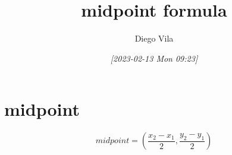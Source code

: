 \documentclass[11pt]{article}
\author{Diego Vila}
\date{\textit{[2023-02-13 Mon 09:23]}}
\title{midpoint formula}
\begin{document}
\maketitle
\tableofcontents


\section{midpoint}
\label{sec:org98dbd91}
$$ midpoint = (\frac{x_2 - x_1}{2}, \frac{y_2 - y_1}{2}) $$
\end{document}
